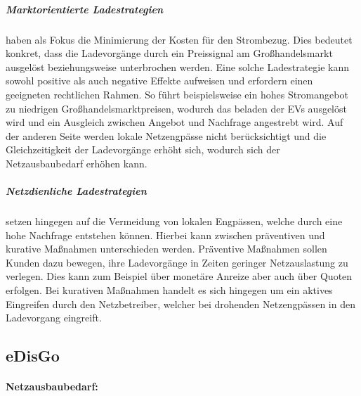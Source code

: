 \subparagraph{Marktorientierte Ladestrategien} haben als Fokus die Minimierung der Kosten für den Strombezug. Dies bedeutet konkret, dass die Ladevorgänge durch ein Preissignal am Großhandelsmarkt ausgelöst beziehungsweise unterbrochen werden. Eine solche Ladestrategie kann sowohl positive als auch negative Effekte aufweisen und erfordern einen geeigneten rechtlichen Rahmen. So führt beispielsweise ein hohes Stromangebot zu niedrigen Großhandelsmarktpreisen, wodurch das beladen der \glspl{EV} ausgelöst wird und ein Ausgleich zwischen Angebot und Nachfrage angestrebt wird. Auf der anderen Seite werden lokale Netzengpässe nicht berücksichtigt und die Gleichzeitigkeit der Ladevorgänge erhöht sich, wodurch sich der Netzausbaubedarf erhöhen kann. \cite{Agora2019} \cite{Dorendorf2019}


\subparagraph{Netzdienliche Ladestrategien} setzen hingegen auf die Vermeidung von lokalen Engpässen, welche durch eine hohe Nachfrage entstehen können. Hierbei kann zwischen präventiven und kurative Maßnahmen unterschieden werden. Präventive Maßnahmen sollen Kunden dazu bewegen, ihre Ladevorgänge in Zeiten geringer Netzauslastung zu verlegen. Dies kann zum Beispiel über monetäre Anreize aber auch über Quoten erfolgen. Bei kurativen Maßnahmen handelt es sich hingegen um ein aktives Eingreifen durch den Netzbetreiber, welcher bei drohenden Netzengpässen in den Ladevorgang eingreift. \cite{Agora2019}


\subsection{eDisGo}

\paragraph{Netzausbaubedarf:}

